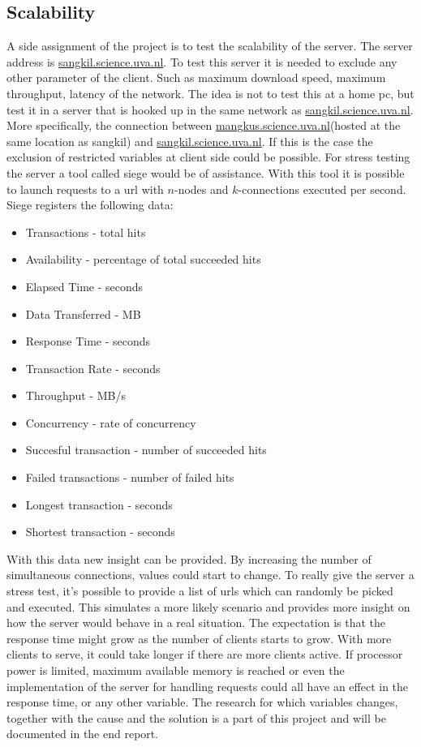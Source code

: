 \subsection{Scalability}
\label{sec:scalability}
A side assignment of the project is to test the scalability of the server. The server address is \url{sangkil.science.uva.nl}. To test this server it is needed to exclude any other parameter of the client. Such as maximum download speed, maximum throughput, latency of the network. The idea is not to test this at a home pc, but test it in a server that is hooked up in the same network as \url{sangkil.science.uva.nl}. More specifically, the connection between \url{mangkus.science.uva.nl}(hosted at the same location as sangkil) and \url{sangkil.science.uva.nl}. If this is the case the exclusion of restricted variables at client side could be possible. 
For stress testing the server a tool called siege \cite{Siege} would be of assistance. With this tool it is possible to launch requests to a url with $n$-nodes and $k$-connections executed per second. Siege registers the following data:
\begin{itemize}
\item Transactions - total hits
\item Availability - percentage of total succeeded hits
\item Elapsed Time - seconds
\item Data Transferred - MB
\item Response Time - seconds
\item Transaction Rate - seconds 
\item Throughput - MB/s
\item Concurrency - rate of concurrency
\item Succesful transaction - number of succeeded hits
\item Failed transactions - number of failed hits
\item Longest transaction - seconds
\item Shortest transaction - seconds
\end{itemize}
With this data new insight can be provided. By increasing the number of simultaneous connections, values could start to change. To really give the server a stress test, it's possible to provide a list of urls which can randomly be picked and executed. This simulates a more likely scenario and provides more insight on how the server would behave in a real situation. The expectation is that the response time might grow as the number of clients starts to grow. With more clients to serve, it could take longer if there are more clients active. If processor power is limited, maximum available memory is reached or even the implementation of the server for handling requests could all have an effect in the response time, or any other variable. The research for which variables changes, together with the cause and the solution is a part of this project and will be documented in the end report. 


